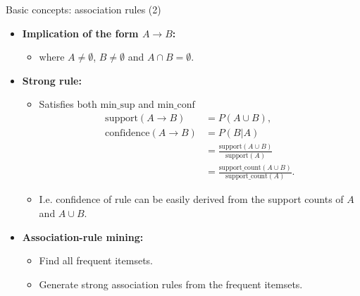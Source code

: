 \documentclass[aspectratio=169,t]{beamer}
\begin{document}
  { 
    \begin{frame}{Basic concepts: association rules (2)}
    \begin{itemize}
      \item \textbf{Implication of the form $A \rightarrow B$:}
      \begin{itemize}
        \item where $A \neq \emptyset$, $B \neq \emptyset$ and $A \cap B = \emptyset$.
      \end{itemize}
      \item \textbf{Strong rule:}
      \begin{itemize}
        \item Satisfies both $\text{min\_sup}$ and $\text{min\_conf}$
        \begin{align}
        \text{support}(A \rightarrow B) &= P(A \cup B),\\
        \text{confidence}(A \rightarrow B) &= P(B | A)\\
        &= \frac{\text{support}(A \cup B)}{\text{support}(A)}\\
        &= \frac{\text{support\_count}(A\cup B)}{\text{support\_count}(A)}.
        \end{align}
        \item I.e. confidence of rule can be easily derived from the support counts of $A$ and $A \cup B$.
      \end{itemize}
      \item \textbf{Association-rule mining:}
      \begin{itemize}
        \item Find all frequent itemsets.
        \item Generate strong association rules from the frequent itemsets.
      \end{itemize}
    \end{itemize}
    \end{frame}
  }
\end{document}
